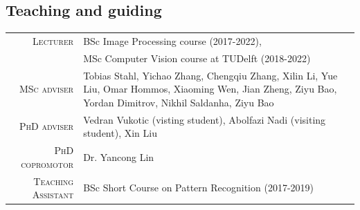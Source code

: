 \documentclass[a4paper, oneside, final]{scrartcl}
\begin{document}
\begin{center}
		\section{Teaching and guiding}
		\begin{tabular}{r@{\hskip 0.3in}p{12.3cm}}
			\textsc{Lecturer}		            & BSc Image Processing course (2017-2022),\\
                                                & MSc Computer Vision course at TUDelft (2018-2022)\\
			\textsc{MSc adviser}                & Tobias Stahl, Yichao Zhang, Chengqiu Zhang, Xilin Li, Yue Liu, Omar Hommos, Xiaoming Wen, Jian Zheng, Ziyu Bao, Yordan Dimitrov, Nikhil Saldanha, Ziyu Bao\\
			\textsc{PhD adviser}                & Vedran Vukotic (visting student), Abolfazi Nadi (visiting student), Xin Liu\\ 
			\textsc{PhD copromotor}             & Dr. Yancong Lin\\ 
            \textsc{Teaching Assistant}         & BSc Short Course on Pattern Recognition (2017-2019)\\
		\end{tabular}

\end{center}
\end{document}
